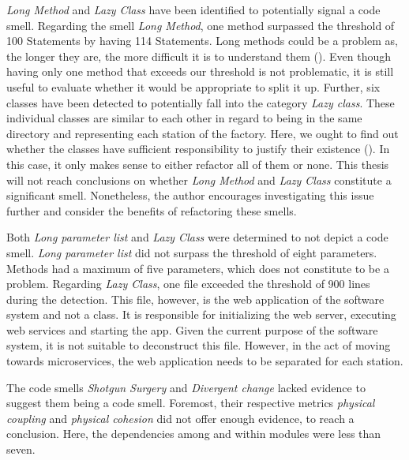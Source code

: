 \emph{Long Method} and \emph{Lazy Class} have been identified to potentially signal a code smell. Regarding the smell \emph{Long Method}, one method surpassed the threshold of 100 Statements by having 114 Statements. Long methods could be a problem as, the longer they are, the more difficult it is to understand them (\cite{fowler2018}). Even though having only one method that exceeds our threshold is not problematic, it is still useful to evaluate whether it would be appropriate to split it up. Further, six classes have been detected to potentially fall into the category \emph{Lazy class}. These individual classes are similar to each other in regard to being in the same directory and representing each station of the factory. Here, we ought to find out whether the classes have sufficient responsibility to justify their existence (\cite{lacerda2020}). In this case, it only makes sense to either refactor all of them or none. This thesis will not reach conclusions on whether \emph{Long Method} and \emph{Lazy Class} constitute a significant smell. Nonetheless, the author encourages investigating this issue further and consider the benefits of refactoring these smells.

Both \emph{Long parameter list} and \emph{Lazy Class} were determined to not depict a code smell. \emph{Long parameter list} did not surpass the threshold of eight parameters. Methods had a maximum of five parameters, which does not constitute to be a problem. Regarding \emph{Lazy Class}, one file exceeded the threshold of 900 lines during the detection. This file, however, is the web application of the software system and not a class. It is responsible for initializing the web server, executing web services and starting the app. Given the current purpose of the software system, it is not suitable to deconstruct this file. However, in the act of moving towards microservices, the web application needs to be separated for each station.

The code smells \emph{Shotgun Surgery} and \emph{Divergent change} lacked evidence to suggest them being a code smell. Foremost, their respective metrics \emph{physical coupling} and \emph{physical cohesion} did not offer enough evidence, to reach a conclusion. Here, the dependencies among and within modules were less than seven.

